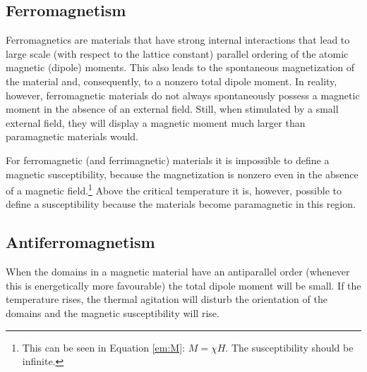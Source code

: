 \subsection{Ferromagnetism}

    Ferromagnetics are materials that have strong internal interactions that lead to large scale (with respect to the lattice constant) parallel ordering of the atomic magnetic (dipole) moments. This also leads to the spontaneous magnetization of the material and, consequently, to a nonzero total dipole moment. In reality, however, ferromagnetic materials do not always spontaneously possess a magnetic moment in the absence of an external field. Still, when stimulated by a small external field, they will display a magnetic moment much larger than paramagnetic materials would.



    \begin{remark}
        For ferromagnetic (and ferrimagnetic) materials it is impossible to define a magnetic susceptibility, because the magnetization is nonzero even in the absence of a magnetic field.\footnote{This can be seen in Equation \eqref{em:M}: $M=\chi H$. The susceptibility should be infinite.} Above the critical temperature it is, however, possible to define a susceptibility because the materials become paramagnetic in this region.
    \end{remark}

\subsection{Antiferromagnetism}

    When the domains in a magnetic material have an antiparallel order (whenever this is energetically more favourable) the total dipole moment will be small. If the temperature rises, the thermal agitation will disturb the orientation of the domains and the magnetic susceptibility will rise.

